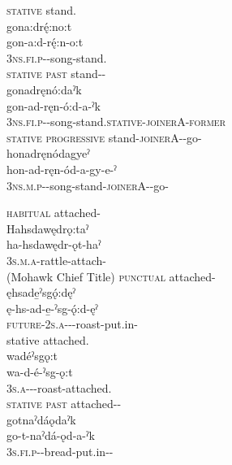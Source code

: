 \ex \textsc{stative}  stand.{\stative}\\
\glll gona:drę́:no:t\\
gon-a:d-rę́:n-o:t\\
\textsc{3ns.fi.p}-{\semireflexive}-song-stand.{\stative}\\
\glt {}
\ex \textsc{stative past}  stand-\textsc{{\joinerA}-{\former}}\\
\glll gonadręnó:daˀk \\
gon-ad-ręn-ó:d-a-ˀk\\
\textsc{3ns.fi.p}-{\semireflexive}-song-stand.\textsc{stative-joinerA-former}\\
\glt {} 
\ex \textsc{stative progressive}  stand-\textsc{joinerA-{\progressive}}-go-{\stative}\\ 
\glll honadręnódagyeˀ \\
hon-ad-ręn-ód-a-gy-e-ˀ\\
\textsc{3ns.m.p}-{\semireflexive}-song-stand-\textsc{joinerA-{\progressive}}-go-{\stative}\\
\glt {} 
\z
\z

\ea\label{ex:od.attached}  
\ea \textsc{habitual}   attached-{\habitual}\\
\glll Hahsdawędrǫ:taˀ \\
ha-hsdawędr-ǫt-haˀ \\
\textsc{3s.m.a}-rattle-attach-{\habitual}\\
\glt {} (Mohawk Chief Title)
\ex \textsc{punctual}  attached-{\punctual}\\
\glll ęhsade̱ˀsgǫ́:dęˀ\\
ę-hs-ad-e̱-ˀsg-ǫ́:d-ęˀ\\
\textsc{future-2s.a-{\semireflexive}}-{\joinerE}-roast-put.in-{\punctual}\\
\glt {} 
\ex \textsc{}stative  attached.{\stative}\\
\glll wadéˀsgǫ:t \\
wa-d-é-ˀsg-ǫ:t\\
\textsc{3s.a-{\semireflexive}}-{\joinerE}-roast-attached.{\stative}\\
\glt {}
\ex \textsc{stative past}  attached-\textsc{{\joinerA}-{\former}}\\
\glll gotnaˀdáǫdaˀk\\
go-t-naˀdá-ǫd-a-ˀk\\
\textsc{3s.fi.p}-{\semireflexive}-bread-put.in-\textsc{{\joinerA}-{\former}}\\
\glt {} 
\z
\z


